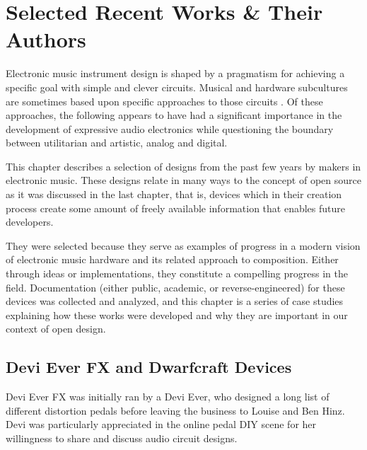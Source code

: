 \chapter{Selected Recent Works & Their Authors}\label{selrecworks}

Electronic music instrument design is shaped by a pragmatism for achieving a specific goal with simple and clever circuits. Musical and hardware subcultures are sometimes based upon specific approaches to those circuits \citep{ghazala2005,collins2006,hegarty2007,novak2013}. Of these approaches, the following appears to have had a significant importance in the development of expressive audio electronics while questioning the boundary between utilitarian and artistic, analog and digital.

This chapter describes a selection of designs from the past few years by makers in electronic music. These designs relate in many ways to the concept of open source as it was discussed in the last chapter, that is, devices which in their creation process create some amount of freely available information that enables future developers.

They were selected because they serve as examples of progress in a modern vision of electronic music hardware and its related approach to composition. Either through ideas or implementations, they constitute a compelling progress in the field. Documentation (either public, academic, or reverse-engineered) for these devices was collected and analyzed, and this chapter is a series of case studies explaining how these works were developed and why they are important in our context of open design. 
 
\section{Devi Ever FX and Dwarfcraft Devices}

Devi Ever FX was initially ran by a Devi Ever, who designed a long list of different distortion pedals before leaving the business to Louise and Ben Hinz. Devi was particularly appreciated in the online pedal DIY scene for her willingness to share and discuss audio circuit designs. 


